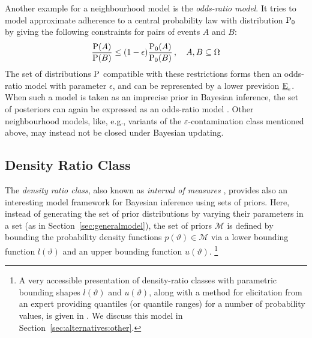 Another example for a neighbourhood model is the \emph{odds-ratio model}.
It tries to model approximate adherence to a central probability law with distribution $\operatorname{P}_0$
by giving the following constraints for pairs of events $A$ and $B$:
\begin{align*}
\frac{\operatorname{P}(A)}{\operatorname{P}(B)} \le (1-\epsilon)\frac{\operatorname{P}_0(A)}{\operatorname{P}_0(B)}\,,\quad A, B \subseteq \Omega
\end{align*}
The set of distributions $\operatorname{P}$ compatible with these restrictions
forms then an odds-ratio model with parameter $\epsilon$,
and can be represented by a lower prevision $\underline{\operatorname{E}}_\epsilon$.
When such a model is taken as an imprecise prior in Bayesian inference,
the set of posteriors can again be expressed as an odds-ratio model
\parencite[\S 7.2]{itip-special}.
Other neighbourhood models, like, e.g.,
variants of the $\varepsilon$-contamination class mentioned above,
may instead not be closed under Bayesian updating.


\subsection{Density Ratio Class}
\label{alternatives:drc}

The \emph{density ratio class}, also known as \emph{interval of measures}
\parencites{1981:derobertis}{1990:berger},
provides also an interesting model framework for Bayesian inference using sets of priors.
Here, instead of generating the set of prior distributions by varying their parameters in a set
(as in Section~\ref{sec:generalmodel}),
the set of priors $\mathcal{M}$ is defined by bounding the probability density functions
$p(\vartheta) \in \mathcal{M}$
via a lower bounding function $l(\vartheta)$ and an upper bounding function $u(\vartheta)$.%
\footnote{\label{foot:rinderknecht}A very accessible presentation of density-ratio classes with
parametric bounding shapes $l(\vartheta)$ and $u(\vartheta)$,
along with a method for elicitation from an expert
providing quantiles (or quantile ranges) for a number of probability values,
is given in \textcite{2011:rinderknecht}.
We discuss this model in Section~\ref{sec:alternatives:other}.}

